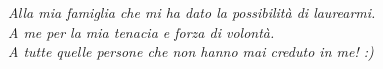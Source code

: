 \null{}
\begin{flushright}
	\textit{Alla mia famiglia che mi ha dato la possibilità di laurearmi.} \\
	\textit{A me per la mia tenacia e forza di volontà.} \\
	\textit{A tutte quelle persone che non hanno mai creduto in me! :)} \\
\end{flushright}
\null